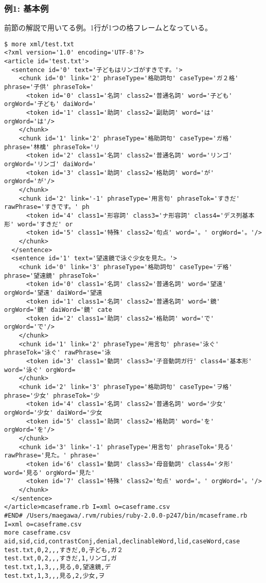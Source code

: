 \subsubsection*{例1: 基本例}

前節の解説で用いてる例。1行が1つの格フレームとなっている。


\begin{Verbatim}[baselinestretch=0.7,frame=single]
$ more xml/test.txt
<?xml version='1.0' encoding='UTF-8'?>
<article id='test.txt'>
  <sentence id='0' text='子どもはリンゴがすきです。'>
    <chunk id='0' link='2' phraseType='格助詞句' caseType='ガ２格' phrase='子供' phraseTok='
      <token id='0' class1='名詞' class2='普通名詞' word='子ども' orgWord='子ども' daiWord='
      <token id='1' class1='助詞' class2='副助詞' word='は' orgWord='は'/>
    </chunk>
    <chunk id='1' link='2' phraseType='格助詞句' caseType='ガ格' phrase='林檎' phraseTok='リ
      <token id='2' class1='名詞' class2='普通名詞' word='リンゴ' orgWord='リンゴ' daiWord='
      <token id='3' class1='助詞' class2='格助詞' word='が' orgWord='が'/>
    </chunk>
    <chunk id='2' link='-1' phraseType='用言句' phraseTok='すきだ' rawPhrase='すきです。' ph
      <token id='4' class1='形容詞' class3='ナ形容詞' class4='デス列基本形' word='すきだ' or
      <token id='5' class1='特殊' class2='句点' word='。' orgWord='。'/>
    </chunk>
  </sentence>
  <sentence id='1' text='望遠鏡で泳ぐ少女を見た。'>
    <chunk id='0' link='3' phraseType='格助詞句' caseType='デ格' phrase='望遠鏡' phraseTok='
      <token id='0' class1='名詞' class2='普通名詞' word='望遠' orgWord='望遠' daiWord='望遠
      <token id='1' class1='名詞' class2='普通名詞' word='鏡' orgWord='鏡' daiWord='鏡' cate
      <token id='2' class1='助詞' class2='格助詞' word='で' orgWord='で'/>
    </chunk>
    <chunk id='1' link='2' phraseType='用言句' phrase='泳ぐ' phraseTok='泳ぐ' rawPhrase='泳
      <token id='3' class1='動詞' class3='子音動詞ガ行' class4='基本形' word='泳ぐ' orgWord=
    </chunk>
    <chunk id='2' link='3' phraseType='格助詞句' caseType='ヲ格' phrase='少女' phraseTok='少
      <token id='4' class1='名詞' class2='普通名詞' word='少女' orgWord='少女' daiWord='少女
      <token id='5' class1='助詞' class2='格助詞' word='を' orgWord='を'/>
    </chunk>
    <chunk id='3' link='-1' phraseType='用言句' phraseTok='見る' rawPhrase='見た。' phrase='
      <token id='6' class1='動詞' class3='母音動詞' class4='タ形' word='見る' orgWord='見た'
      <token id='7' class1='特殊' class2='句点' word='。' orgWord='。'/>
    </chunk>
  </sentence>
</article>mcaseframe.rb I=xml o=caseframe.csv
#END# /Users/maegawa/.rvm/rubies/ruby-2.0.0-p247/bin/mcaseframe.rb I=xml o=caseframe.csv
more caseframe.csv
aid,sid,cid,contrastConj,denial,declinableWord,lid,caseWord,case
test.txt,0,2,,,すきだ,0,子ども,ガ２
test.txt,0,2,,,すきだ,1,リンゴ,ガ
test.txt,1,3,,,見る,0,望遠鏡,デ
test.txt,1,3,,,見る,2,少女,ヲ
\end{Verbatim}
